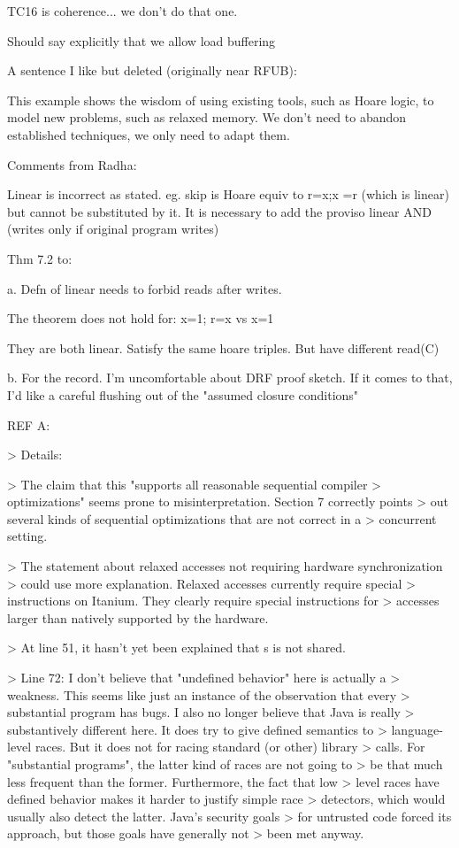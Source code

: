 \documentclass[acmsmall,review,anonymous,screen]{acmart}\settopmatter{printfolios=true}
\theoremstyle{acmdefinition}
\begin{document}
TC16 is coherence... we don't do that one.


Should say explicitly that we allow load buffering


A sentence I like but deleted (originally near RFUB):

This example shows the wisdom of using existing tools, such as Hoare logic,
to model new problems, such as relaxed memory.  We don't need to abandon
established techniques, we only need to adapt them.

Comments from Radha:

Linear is incorrect as stated. eg. skip is Hoare equiv to r=x;x =r (which is
linear) but cannot be substituted by it.  It is necessary to add the proviso
linear AND (writes only if original program writes)

Thm 7.2 to:

    
a. Defn of linear needs to forbid reads after writes. 

The theorem does not hold for:
   x=1; r=x
vs
   x=1

They are both linear. Satisfy the same hoare triples.  But have different
read(C)


b. For the record.  I'm uncomfortable about DRF proof sketch.  If it comes to
that, I'd like a careful flushing out of the "assumed closure conditions"

REF A:

> Details:

> The claim that this "supports all reasonable sequential compiler
> optimizations" seems prone to misinterpretation. Section 7 correctly points
> out several kinds of sequential optimizations that are not correct in a
> concurrent setting. 

> The statement about relaxed accesses not requiring hardware synchronization
> could use more explanation. Relaxed accesses currently require special
> instructions on Itanium. They clearly require special instructions for
> accesses larger than natively supported by the hardware. 

> At line 51, it hasn't yet been explained that s is not shared.

> Line 72: I don't believe that "undefined behavior" here is actually a
> weakness. This seems like just an instance of the observation that every
> substantial program has bugs. I also no longer believe that Java is really
> substantively different here. It does try to give defined semantics to
> language-level races. But it does not for racing standard (or other) library
> calls. For "substantial programs", the latter kind of races are not going to
> be that much less frequent than the former. Furthermore, the fact that low
> level races have defined behavior makes it harder to justify simple race
> detectors, which would usually also detect the latter. Java's security goals
> for untrusted code forced its approach, but those goals have generally not
> been met anyway. 
\end{document}
